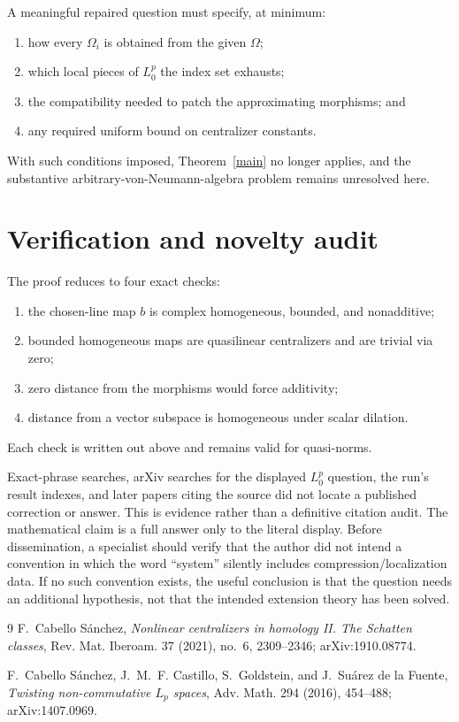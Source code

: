 \documentclass[11pt]{article}
\begin{document}
A meaningful repaired question must specify, at minimum:
\begin{enumerate}
\item how every $\Omega_i$ is obtained from the given $\Omega$;
\item which local pieces of $L^p_0$ the index set exhausts;
\item the compatibility needed to patch the approximating morphisms; and
\item any required uniform bound on centralizer constants.
\end{enumerate}
With such conditions imposed, Theorem~\ref{main} no longer applies, and the
substantive arbitrary-von-Neumann-algebra problem remains unresolved here.

\section{Verification and novelty audit}

The proof reduces to four exact checks:
\begin{enumerate}
\item the chosen-line map $b$ is complex homogeneous, bounded, and nonadditive;
\item bounded homogeneous maps are quasilinear centralizers and are trivial
via zero;
\item zero distance from the morphisms would force additivity;
\item distance from a vector subspace is homogeneous under scalar dilation.
\end{enumerate}
Each check is written out above and remains valid for quasi-norms.

Exact-phrase searches, arXiv searches for the displayed $L^p_0$ question, the
run's result indexes, and later papers citing the source did not locate a
published correction or answer.  This is evidence rather than a definitive
citation audit.  The mathematical claim is a full answer only to the literal
display.  Before dissemination, a specialist should verify that the author
did not intend a convention in which the word ``system'' silently includes
compression/localization data.  If no such convention exists, the useful
conclusion is that the question needs an additional hypothesis, not that the
intended extension theory has been solved.

\begin{thebibliography}{9}
F.~Cabello S\'anchez,
\emph{Nonlinear centralizers in homology II. The Schatten classes},
Rev. Mat. Iberoam. 37 (2021), no.~6, 2309--2346;
arXiv:1910.08774.

F.~Cabello S\'anchez, J.~M.~F. Castillo, S.~Goldstein, and
J.~Su\'arez de la Fuente,
\emph{Twisting non-commutative $L_p$ spaces},
Adv. Math. 294 (2016), 454--488; arXiv:1407.0969.
\end{thebibliography}
\end{document}

